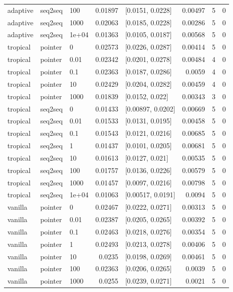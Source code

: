 \documentclass[10pt]{article}
\begin{document}
{\begin{longtable}{lllrlrrr}
adaptive & seq2seq & 100 & 0.01897 & [0.0151, 0.0228] & 0.00497 & 5 & 0\\
adaptive & seq2seq & 1000 & 0.02063 & [0.0185, 0.0228] & 0.00286 & 5 & 0\\
adaptive & seq2seq & 1e+04 & 0.01363 & [0.0105, 0.0187] & 0.00568 & 5 & 0\\
tropical & pointer & 0 & 0.02573 & [0.0226, 0.0287] & 0.00414 & 5 & 0\\
tropical & pointer & 0.01 & 0.02342 & [0.0201, 0.0278] & 0.00484 & 4 & 0\\
tropical & pointer & 0.1 & 0.02363 & [0.0187, 0.0286] & 0.0059 & 4 & 0\\
tropical & pointer & 10 & 0.02429 & [0.0204, 0.0282] & 0.00459 & 4 & 0\\
tropical & pointer & 1000 & 0.01839 & [0.0152, 0.022] & 0.00343 & 3 & 0\\
tropical & seq2seq & 0 & 0.01433 & [0.00897, 0.0202] & 0.00669 & 5 & 0\\
tropical & seq2seq & 0.01 & 0.01533 & [0.0131, 0.0195] & 0.00458 & 5 & 0\\
tropical & seq2seq & 0.1 & 0.01543 & [0.0121, 0.0216] & 0.00685 & 5 & 0\\
tropical & seq2seq & 1 & 0.01437 & [0.0101, 0.0205] & 0.00681 & 5 & 0\\
tropical & seq2seq & 10 & 0.01613 & [0.0127, 0.021] & 0.00535 & 5 & 0\\
tropical & seq2seq & 100 & 0.01757 & [0.0136, 0.0226] & 0.00579 & 5 & 0\\
tropical & seq2seq & 1000 & 0.01457 & [0.0097, 0.0216] & 0.00798 & 5 & 0\\
tropical & seq2seq & 1e+04 & 0.01063 & [0.00517, 0.0191] & 0.0094 & 5 & 0\\
vanilla & pointer & 0 & 0.02467 & [0.0222, 0.0271] & 0.00313 & 5 & 0\\
vanilla & pointer & 0.01 & 0.02387 & [0.0205, 0.0265] & 0.00392 & 5 & 0\\
vanilla & pointer & 0.1 & 0.02463 & [0.0218, 0.0276] & 0.00354 & 5 & 0\\
vanilla & pointer & 1 & 0.02493 & [0.0213, 0.0278] & 0.00406 & 5 & 0\\
vanilla & pointer & 10 & 0.0235 & [0.0198, 0.0269] & 0.00461 & 5 & 0\\
vanilla & pointer & 100 & 0.02363 & [0.0206, 0.0265] & 0.0039 & 5 & 0\\
vanilla & pointer & 1000 & 0.0255 & [0.0239, 0.0271] & 0.0021 & 5 & 0\\

\end{longtable}}
\end{document}
